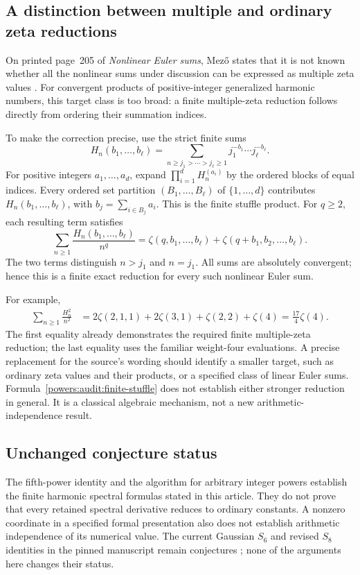 \subsection{A distinction between multiple and ordinary zeta reductions}

On printed page~205 of \emph{Nonlinear Euler sums}, Mez\H{o}
states that it is not known whether all the nonlinear sums under
discussion can be expressed as multiple zeta values \cite{Mezo2014}.
For convergent products of positive-integer generalized harmonic
numbers, this target class is too broad: a finite multiple-zeta
reduction follows directly from ordering their summation indices.

To make the correction precise, use the strict finite sums
\[
 H_n(b_1,\ldots,b_\ell)
 =\sum_{n\ge j_1>\cdots>j_\ell\ge1}
       j_1^{-b_1}\cdots j_\ell^{-b_\ell}.
\]
For positive integers \(a_1,\ldots,a_d\), expand
\(\prod_{i=1}^d H_n^{(a_i)}\) by the ordered blocks of equal
indices. Every ordered set partition
\((B_1,\ldots,B_\ell)\) of \(\{1,\ldots,d\}\) contributes
\(H_n(b_1,\ldots,b_\ell)\), with
\(b_j=\sum_{i\in B_j}a_i\). This is the finite stuffle product.
For \(q\ge2\), each resulting term satisfies
\begin{equation}
 \sum_{n\ge1}\frac{H_n(b_1,\ldots,b_\ell)}{n^q}
 =\zeta(q,b_1,\ldots,b_\ell)
       +\zeta(q+b_1,b_2,\ldots,b_\ell).
 \label{powers:audit:finite-stuffle}
\end{equation}
The two terms distinguish \(n>j_1\) and \(n=j_1\).
All sums are absolutely convergent; hence this is a finite exact
reduction for every such nonlinear Euler sum.

For example,
\begin{align}
 \sum_{n\ge1}\frac{H_n^2}{n^2}
 &=2\zeta(2,1,1)+2\zeta(3,1)+\zeta(2,2)+\zeta(4)
   =\frac{17}{4}\zeta(4).
 \label{powers:audit:example}
\end{align}
The first equality already demonstrates the required finite
multiple-zeta reduction; the last equality uses the familiar
weight-four evaluations. A precise replacement for the source's
wording should identify a smaller target, such as ordinary zeta
values and their products, or a specified class of linear Euler
sums. Formula~\eqref{powers:audit:finite-stuffle} does not establish
either stronger reduction in general. It is a classical algebraic
mechanism, not a new arithmetic-independence result.

\subsection{Unchanged conjecture status}

The fifth-power identity and the algorithm for arbitrary integer
powers establish the finite harmonic spectral formulas stated in
this article. They do not prove that every retained spectral
derivative reduces to ordinary constants. A nonzero coordinate in a
specified formal presentation also does not establish arithmetic
independence of its numerical value. The current Gaussian
\(S_6\) and revised \(S_8\) identities in the pinned manuscript
remain conjectures \cite{Repo}; none of the arguments here changes
their status.

